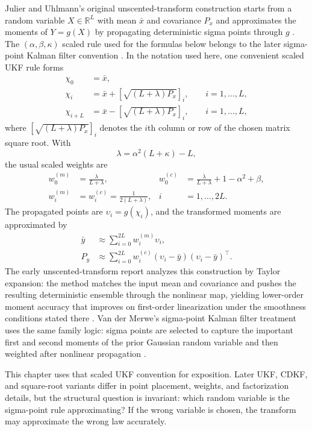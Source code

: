 Julier and Uhlmann's original unscented-transform construction starts from a
random variable $X\in\mathbb{R}^L$ with mean $\bar x$ and covariance $P_x$ and
approximates the moments of $Y=g(X)$ by propagating deterministic sigma points
through $g$ \citep{julier1996general,julier1997new}.  The
$(\alpha,\beta,\kappa)$ scaled rule used for the formulas below belongs to the
later sigma-point Kalman filter convention \citep{vandermerwe2004sigma}.  In
the notation used here, one convenient scaled UKF rule forms
\begin{align}
  \chi_0 &= \bar x,\\
  \chi_i &= \bar x+\left[\sqrt{(L+\lambda)P_x}\right]_i,
    \qquad i=1,\ldots,L,\\
  \chi_{i+L} &= \bar x-\left[\sqrt{(L+\lambda)P_x}\right]_i,
    \qquad i=1,\ldots,L,
    \label{eq:bf-scaled-ukf-points}
\end{align}
where $[\sqrt{(L+\lambda)P_x}]_i$ denotes the $i$th column or row of the chosen
matrix square root.  With
\[
  \lambda=\alpha^2(L+\kappa)-L,
\]
the usual scaled weights are
\begin{align}
  w_0^{(m)} &= \frac{\lambda}{L+\lambda},&
  w_0^{(c)} &= \frac{\lambda}{L+\lambda}+1-\alpha^2+\beta,\\
  w_i^{(m)} &= w_i^{(c)} = \frac{1}{2(L+\lambda)},
  & i&=1,\ldots,2L.
  \label{eq:bf-scaled-ukf-weights}
\end{align}
The propagated points are $\upsilon_i=g(\chi_i)$, and the transformed moments
are approximated by
\begin{align}
  \bar y &\approx \sum_{i=0}^{2L} w_i^{(m)}\upsilon_i,\\
  P_y &\approx
    \sum_{i=0}^{2L} w_i^{(c)}
      (\upsilon_i-\bar y)(\upsilon_i-\bar y)^\top .
  \label{eq:bf-ut-transformed-moments}
\end{align}
The early unscented-transform report analyzes this construction by Taylor
expansion: the method matches the input mean and covariance and pushes the
resulting deterministic ensemble through the nonlinear map, yielding lower-order
moment accuracy that improves on first-order linearization under the smoothness
conditions stated there \citep{julier1996general}.  Van der Merwe's
sigma-point Kalman filter treatment uses the same family logic: sigma points
are selected to capture the important first and second moments of the prior
Gaussian random variable and then weighted after nonlinear propagation
\citep{vandermerwe2004sigma}.

This chapter uses that scaled UKF convention for exposition.  Later UKF, CDKF,
and square-root variants differ in point placement, weights, and factorization
details, but the structural question is invariant: which random variable is the
sigma-point rule approximating?  If the wrong variable is chosen, the transform
may approximate the wrong law accurately.

